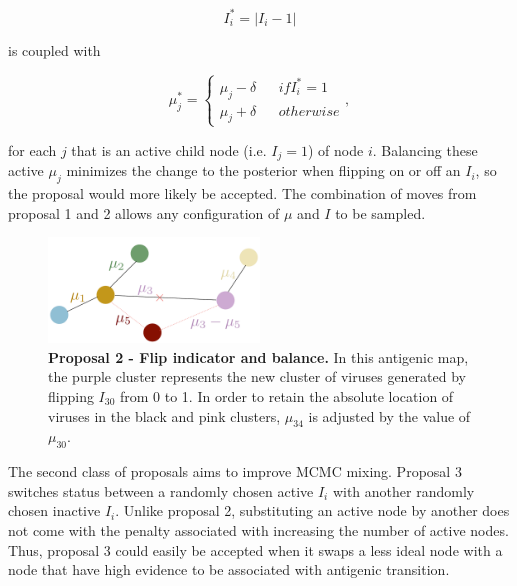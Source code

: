 \documentclass[11pt,oneside,letterpaper]{article}
\begin{document}
\begin{equation}
\label{flipI-equation}
I_i^* = | I_i - 1 |
\end{equation}

is coupled with

\begin{equation}
\label{muBalance-equation}
	\mu_j^{*} =  \left \{
\begin{array}{lllr}
    \mu_j - \delta	&	& if I_i^{*} = 1\\
    \mu_j + \delta	& & otherwise
\end{array}
\right.
,
\end{equation}

for each $j$ that is an active child node (i.e. $I_j = 1$) of node $i$. Balancing these active $\mu_j$ minimizes the change to the posterior when flipping on or off an $I_i$, so the proposal would more likely be accepted. The combination of moves from proposal 1 and 2 allows any configuration of $\mu$ and $I$ to be sampled.



\begin{figure}[h]
	\centering		
	\includegraphics[width=0.5\textwidth]{figures/lineart/flipAndBalance}
	\caption{\textbf{Proposal 2 - Flip indicator and balance.} 
In this antigenic map, the purple cluster represents the new cluster of viruses generated by flipping $I_{30}$ from 0 to 1. In order to retain the absolute location of viruses in the black and pink clusters,  $\mu_{34}$ is adjusted by the value of $\mu_{30}$.
	} 
	\label{flipAndBalance} 
\end{figure}


The second class of proposals aims to improve MCMC mixing.
Proposal 3 switches status between a randomly chosen active $I_i$ with another randomly chosen inactive $I_i$. 
Unlike proposal 2, substituting an active node by another does not come with the penalty associated with increasing the number of active nodes.
Thus, proposal 3 could easily be accepted when it swaps a less ideal node with a node that have high evidence to be associated with antigenic transition.
\end{document}
